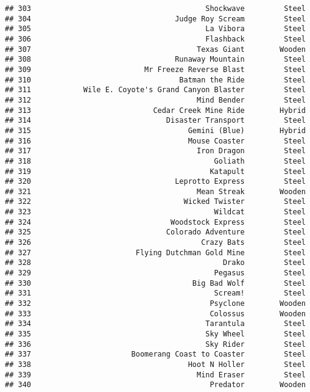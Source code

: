 \documentclass[
]{article}
\begin{document}
\begin{verbatim}
## 303                                        Shockwave         Steel
## 304                                 Judge Roy Scream         Steel
## 305                                        La Vibora         Steel
## 306                                        Flashback         Steel
## 307                                      Texas Giant        Wooden
## 308                                 Runaway Mountain         Steel
## 309                          Mr Freeze Reverse Blast         Steel
## 310                                  Batman the Ride         Steel
## 311            Wile E. Coyote's Grand Canyon Blaster         Steel
## 312                                      Mind Bender         Steel
## 313                            Cedar Creek Mine Ride        Hybrid
## 314                               Disaster Transport         Steel
## 315                                    Gemini (Blue)        Hybrid
## 316                                    Mouse Coaster         Steel
## 317                                      Iron Dragon         Steel
## 318                                          Goliath         Steel
## 319                                         Katapult         Steel
## 320                                 Leprotto Express         Steel
## 321                                      Mean Streak        Wooden
## 322                                   Wicked Twister         Steel
## 323                                          Wildcat         Steel
## 324                                Woodstock Express         Steel
## 325                               Colorado Adventure         Steel
## 326                                       Crazy Bats         Steel
## 327                        Flying Dutchman Gold Mine         Steel
## 328                                            Drako         Steel
## 329                                          Pegasus         Steel
## 330                                     Big Bad Wolf         Steel
## 331                                          Scream!         Steel
## 332                                         Psyclone        Wooden
## 333                                         Colossus        Wooden
## 334                                        Tarantula         Steel
## 335                                        Sky Wheel         Steel
## 336                                        Sky Rider         Steel
## 337                       Boomerang Coast to Coaster         Steel
## 338                                    Hoot N Holler         Steel
## 339                                      Mind Eraser         Steel
## 340                                         Predator        Wooden

\end{verbatim}
\end{document}
